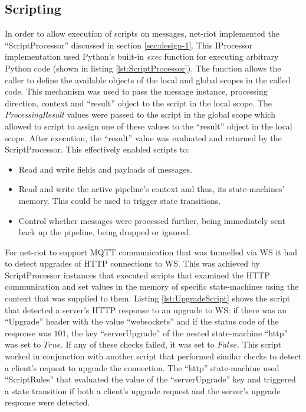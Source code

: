 \subsection{Scripting}
In order to allow execution of scripts on messages, net-riot implemented the \enquote{ScriptProcessor} discussed in section \ref{sec:design-1}. This IProcessor implementation used Python's built-in \emph{exec} function for executing arbitrary Python code (shown in listing \ref{lst:ScriptProcessor}). The function allows the caller to define the available objects of the local and global scopes in the called code. This mechanism was used to pass the message instance, processing direction, context and \enquote{result} object to the script in the local scope. The \emph{ProcessingResult} values were passed to the script in the global scope which allowed to script to assign one of these values to the \enquote{result} object in the local scope. After execution, the \enquote{result} value was evaluated and returned by the ScriptProcessor. This effectively enabled scripts to:
\begin{itemize}
    \item Read and write fields and payloads of messages.
    \item Read and write the active pipeline's context and thus, its state-machines' memory. This could be used to trigger state transitions.
    \item Control whether messages were processed further, being immediately sent back up the pipeline, being dropped or ignored.
\end{itemize}

For net-riot to support \ac{MQTT} communication that was tunnelled via \ac{WS} it had to detect upgrades of \ac{HTTP} connections to \ac{WS}. This was achieved by ScriptProcessor instances that executed scripts that examined the \ac{HTTP} communication and set values in the memory of specific state-machines using the context that was supplied to them. Listing \ref{lst:UpgradeScript} shows the script that detected a server's \ac{HTTP} response to an upgrade to \ac{WS}: if there was an \enquote{Upgrade} header with the value \enquote{websockets} and if the status code of the response was $101$, the key \enquote{serverUpgrade} of the nested state-machine \enquote{http} was set to $True$. If any of these checks failed, it was set to $False$. This script worked in conjunction with another script that performed similar checks to detect a client's request to upgrade the connection. The \enquote{http} state-machine used \enquote{ScriptRules} that evaluated the value of the \enquote{serverUpgrade} key and triggered a state transition if both a client's upgrade request and the server's upgrade response were detected.


